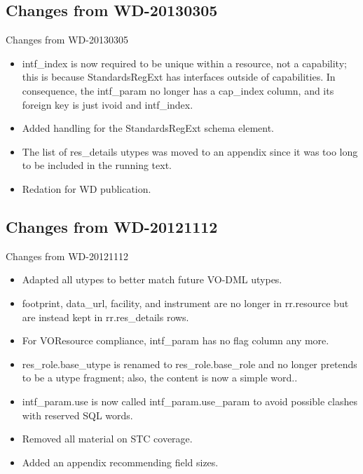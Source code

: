 \documentclass[11pt,a4paper]{ivoa}
\begin{document}


\subsection{Changes from WD-20130305}

\label{changes-20130305}

Changes from WD-20130305
\begin{itemize}

\item intf\_index is now required to be unique within a resource, not a
capability; this is because StandardsRegExt has interfaces outside
of capabilities.  In consequence, the intf\_param no longer has a
cap\_index column, and its foreign key is just ivoid and intf\_index.{}

\item Added handling for the StandardsRegExt schema element.{}

\item The list of res\_details utypes was moved to an appendix since
it was too long to be included in the running text.{}

\item Redation for WD publication.{}

\end{itemize}



\subsection{Changes from WD-20121112}

\label{changes-20121112}

Changes from WD-20121112
\begin{itemize}

\item Adapted all utypes to better match future VO-DML utypes.{}

\item footprint, data\_url, facility, and instrument are no longer in rr.resource
but are instead kept in rr.res\_details rows.{}

\item For VOResource compliance, intf\_param has no flag column any more.{}

\item res\_role.base\_utype is renamed to res\_role.base\_role and no longer
pretends to be a utype fragment; also, the content is now a simple
word..{}

\item intf\_param.use is now called intf\_param.use\_param to avoid possible
clashes with reserved SQL words.{}

\item Removed all material on STC coverage.{}

\item Added an appendix recommending field sizes.{}

\end{itemize}






\end{document}
